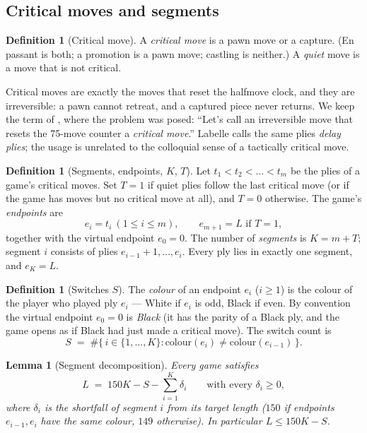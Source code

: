 \documentclass[11pt]{article}
\newtheorem{lemma}[theorem]{Lemma}
\theoremstyle{definition}
\newtheorem{definition}[theorem]{Definition}
\theoremstyle{remark}
\theoremstyle{plain}
\begin{document}
\subsection{Critical moves and segments}

\begin{definition}[Critical move]\label{def:critical}
A \emph{critical move} is a pawn move or a capture. (En passant is both; a
promotion is a pawn move; castling is neither.) A \emph{quiet} move is a
move that is not critical.
\end{definition}

Critical moves are exactly the moves that reset the halfmove clock, and they
are irreversible: a pawn cannot retreat, and a captured piece never
returns. We keep the term of \cite{murphy2020longest}, where the problem
was posed: ``Let's call an irreversible move that resets the 75-move
counter a \emph{critical move}.'' Labelle \cite{labelle2015longest}
calls the same plies \emph{delay plies}; the usage is unrelated to the
colloquial sense of a tactically critical move.

\begin{definition}[Segments, endpoints, $K$, $T$]\label{def:segments}
Let $t_1 < t_2 < \dots < t_m$ be the plies of a game's critical moves. Set
$T = 1$ if quiet plies follow the last critical move (or if the game has
moves but no critical move at all), and $T = 0$ otherwise. The game's
\emph{endpoints} are
\[
  e_i = t_i \ (1 \le i \le m), \qquad e_{m+1} = L \text{ if } T = 1,
\]
together with the virtual endpoint $e_0 = 0$. The number of \emph{segments}
is $K = m + T$; segment $i$ consists of plies $e_{i-1}+1, \dots, e_i$.
Every ply lies in exactly one segment, and $e_K = L$.
\end{definition}

\begin{definition}[Switches $S$]\label{def:switches}
The \emph{colour} of an endpoint $e_i$ ($i \ge 1$) is the colour of the
player who played ply $e_i$ --- White if $e_i$ is odd, Black if even. By
convention the virtual endpoint $e_0 = 0$ is \emph{Black} (it has the parity
of a Black ply, and the game opens as if Black had just made a critical
move). The switch count is
\[
  S \;=\; \#\{\, i \in \{1,\dots,K\} : \text{colour}(e_i) \ne
  \text{colour}(e_{i-1}) \,\}.
\]
\end{definition}

\begin{lemma}[Segment decomposition]\label{lem:decomposition}
Every game satisfies
\[
  L \;=\; 150K - S - \sum_{i=1}^{K}\delta_i
  \qquad\text{with every } \delta_i \ge 0,
\]
where $\delta_i$ is the shortfall of segment $i$ from its target length
($150$ if endpoints $e_{i-1},e_i$ have the same colour, $149$ otherwise).
In particular $L \le 150K - S$.
\end{lemma}
\end{document}
